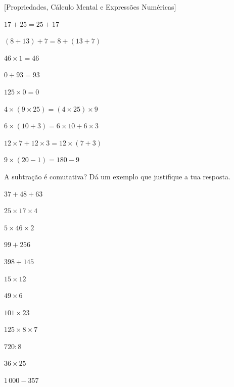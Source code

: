 \documentclass[12pt]{article}
\begin{document}
[Propriedades, Cálculo Mental e Expressões Numéricas]


\begin{exercicios}
  \item $17 + 25 = 25 + 17$
  \item $(8 + 13) + 7 = 8 + (13 + 7)$
  \item $46 \times 1 = 46$
  \item $0 + 93 = 93$
  \item $125 \times 0 = 0$
  \item $4 \times (9 \times 25) = (4 \times 25) \times 9$
  \item $6 \times (10 + 3) = 6 \times 10 + 6 \times 3$
  \item $12 \times 7 + 12 \times 3 = 12 \times (7 + 3)$
  \item $9 \times (20 - 1) = 180 - 9$
  \item A subtração é comutativa? Dá um exemplo que justifique a tua resposta.
\end{exercicios}

\begin{exercicios}
  \item $37 + 48 + 63$
  \item $25 \times 17 \times 4$
  \item $5 \times 46 \times 2$
  \item $99 + 256$
  \item $398 + 145$
  \item $15 \times 12$
  \item $49 \times 6$
  \item $101 \times 23$
  \item $125 \times 8 \times 7$
  \item $720 : 8$
  \item $36 \times 25$
  \item $1\,000 - 357$
\end{exercicios}
\end{document}
